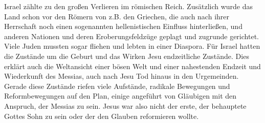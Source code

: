 Israel zählte zu den großen Verlieren im römischen Reich. Zusätzlich wurde das Land schon vor den Römern von z.B. den Griechen, die auch nach ihrer Herrschaft noch einen sogenannten hellenistischen Einfluss hinterließen, und anderen Nationen und deren Eroberungsfeldzüge geplagt und zugrunde gerichtet. Viele Juden mussten sogar fliehen und lebten in einer Diaspora. Für Israel hatten die Zustände um die Geburt und das Wirken Jesu endzeitliche Zustände. Dies erklärt auch die Weltansicht einer bösen Welt und einer nahestenden Endzeit und Wiederkunft des Messias, auch nach Jesu Tod hinaus in den Urgemeinden. Gerade diese Zustände riefen viele Aufstände, radikale Bewegungen und Reformbewegungen auf den Plan, einige angeführt von Gläubigen mit den Anspruch, der Messias zu sein. Jesus war also nicht der erste, der behauptete Gottes Sohn zu sein oder der den Glauben reformieren wollte.

